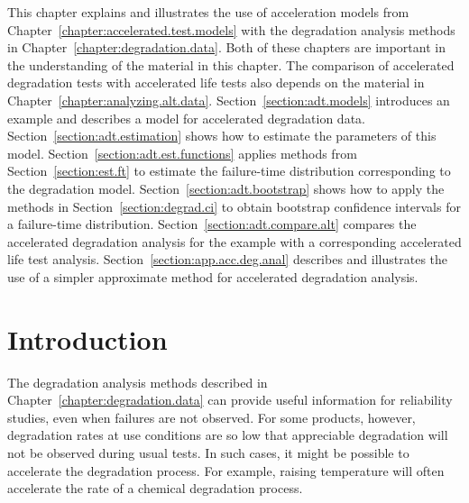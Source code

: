 This chapter explains and illustrates the use of acceleration models
from Chapter~\ref{chapter:accelerated.test.models} with the
degradation analysis methods in
Chapter~\ref{chapter:degradation.data}.  Both of these chapters are
important in the understanding of the material in this chapter.  The
comparison of accelerated degradation tests with accelerated life
tests also depends on the material in
Chapter~\ref{chapter:analyzing.alt.data}.
Section~\ref{section:adt.models} introduces an example and describes
a model for accelerated degradation data.
Section~\ref{section:adt.estimation} shows how to estimate the
parameters of this model.  Section~\ref{section:adt.est.functions}
applies methods from Section~\ref{section:est.ft} to estimate the
failure-time distribution corresponding to the degradation model.
Section~\ref{section:adt.bootstrap} shows how to apply the methods
in Section~\ref{section:degrad.ci} to obtain bootstrap confidence
intervals for a failure-time distribution.
Section~\ref{section:adt.compare.alt} compares the accelerated
degradation analysis for the example with a corresponding
accelerated life test analysis.
Section~\ref{section:app.acc.deg.anal} describes and illustrates the
use of a simpler approximate method for accelerated degradation
analysis.
\section{Introduction}
The degradation analysis methods described in
Chapter~\ref{chapter:degradation.data} can provide useful
information for reliability studies, even when failures are not
observed.  For some products, however, degradation rates at use
conditions are so low that appreciable degradation will not be
observed during usual tests. In such cases, it might be possible to
accelerate the degradation process. For example, raising temperature
will often accelerate the rate of a chemical degradation process.

